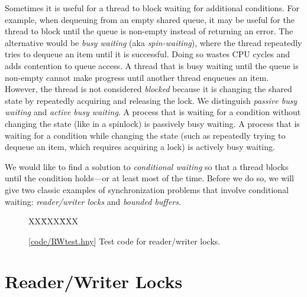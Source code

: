 \documentclass{report}
\newcommand{\harmonysource}[1]{
\begin{tabbing}
XX\=XXX\=XXX\kill
    
\end{tabbing}
}
\newcommand{\harmonylink}[1]{%
[\href{https://harmony.cs.cornell.edu/#1}{\underline{#1}}]%
}
\newenvironment{code}{
\tcolorbox
}{
\endtcolorbox
}
\begin{document}
%
%
Sometimes it is useful for a thread to block waiting for additional
conditions.
For example, when dequeuing from an empty shared queue,
it may be useful for the thread to block until the queue is non-empty
instead of returning an error.
The alternative would be \emph{busy waiting} (aka \emph{spin-waiting}),
where the thread repeatedly tries to dequeue an item until it is successful.
Doing so wastes CPU cycles and adds contention to queue access.
%
A thread that is busy waiting until the queue is non-empty cannot
make progress until another thread enqueues an item.
However, the thread is not considered \emph{blocked} because it is
changing the shared state by repeatedly acquiring and releasing the
lock.
We distinguish \emph{passive busy waiting} and \emph{active busy waiting}.
A process that is waiting for a condition without changing the state
(like in a spinlock) is passively busy waiting.
A process that is waiting for a condition while changing the state
(such as repeatedly trying to dequeue an item, which requires
acquiring a lock) is actively busy waiting.

We would like to find a solution to \emph{conditional waiting}
so that a thread blocks until the condition holds---or at least most
of the time.
Before we do so, we will give two classic examples of synchronization
problems that involve conditional waiting: \emph{reader/writer locks}
and \emph{bounded buffers}.

\begin{figure}
\begin{code}
\harmonysource{RWtest}
\end{code}
\caption{\harmonylink{code/RWtest.hny} Test code for reader/writer locks.}
\label{fig:rwtest}
\end{figure}

\section{Reader/Writer Locks}
%
%

\end{document}
